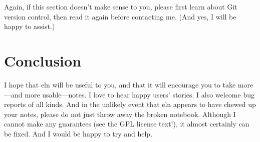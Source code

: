 \documentclass[11pt]{report}
\begin{document}
Again, if this section doesn't make sense to you, please first learn
about Git version control, then read it again before
contacting me. (And yes, I will be happy to assist.)

\section{Conclusion}

I hope that eln will be useful to you, and that it will encourage you
to take more---and more usable---notes. I love to hear happy users'
stories. I also welcome bug reports of all kinds. And in the unlikely
event that eln appears to have chewed up your notes, please do not
just throw away the broken notebook. Although I cannot make any
guarantees (see the GPL license text!), it almost certainly can be
fixed. And I would be happy to try and help.
\end{document}
